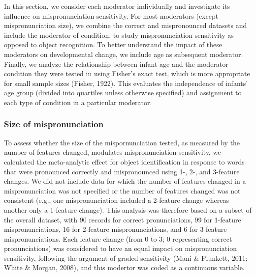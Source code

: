 \documentclass[man]{apa6}
\begin{document}
In this section, we consider each moderator individually and investigate its influence on mispronunciation sensitivity. For most moderators (except mispronunciation size), we combine the correct and mispronounced datasets and include the moderator of condition, to study mispronunciation sensitivity as opposed to object recognition. To better understand the impact of these moderators on developmental change, we include age as subsequent moderator. Finally, we analyze the relationship between infant age and the moderator condition they were tested in using Fisher's exact test, which is more appropriate for small sample sizes (Fisher, 1922). This evaluates the independence of infants' age group (divided into quartiles unless otherwise specified) and assignment to each type of condition in a particular moderator.

\hypertarget{size-of-mispronunciation}{%
\subsubsection{Size of mispronunciation}\label{size-of-mispronunciation}}

To assess whether the size of the mispornunciation tested, as measured by the number of features changed, modulates mispronunciation sensitivity, we calculated the meta-analytic effect for object identification in response to words that were pronounced correctly and mispronounced using 1-, 2-, and 3-feature changes. We did not include data for which the number of features changed in a mispronunciation was not specified or the number of features changed was not consistent (e.g., one mispronunciation included a 2-feature change whereas another only a 1-feature change). This analysis was therefore based on a subset of the overall dataset, with 90 records for correct pronunciations, 99 for 1-feature mispronunciations, 16 for 2-feature mispronunciations, and 6 for 3-feature mispronunciations. Each feature change (from 0 to 3; 0 representing correct pronunciations) was considered to have an equal impact on mispronunciation sensitivity, following the argument of graded sensitivity (Mani \& Plunkett, 2011; White \& Morgan, 2008), and this modertor was coded as a continuous variable.
\end{document}
